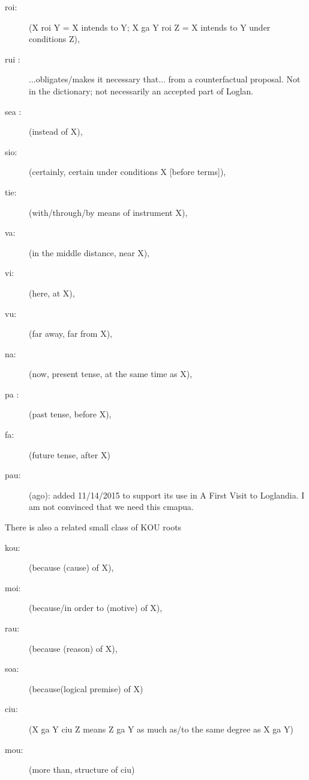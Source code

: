 \documentclass[12pt]{book}
\begin{document}
\begin{description}
\item[roi:] (X roi Y = X intends to Y; X ga Y roi Z = X intends to Y under conditions Z), 

\item[rui :] ...obligates/makes it necessary that... from a counterfactual proposal.  Not in the dictionary; not necessarily an accepted part of Loglan.

\item[sea :] (instead of X), 

\item[sio:]  (certainly, certain under conditions X [before terms]), 

\item[tie:]  (with/through/by means of instrument X), 

\item[va:]  (in the middle distance, near X), 

\item[vi:]  (here, at X), 

\item[vu:]  (far away, far from X), 

\item[na:]  (now, present tense, at the same time as X), 

\item[pa  :] (past tense, before X), 

\item[fa:]  (future tense, after X)

\item[pau:]  (ago):  added 11/14/2015 to support its use in A First Visit to Loglandia.  I am not convinced that we need this cmapua.


\end{description}

There is also a  related small class of KOU roots 

\begin{description}
\item[kou:] (because (cause)  of X), 
\item[moi:] (because/in order to (motive) of X), 
\item[rau:] (because (reason)  of X), 
\item[soa:] (because(logical premise) of X)

\item[ciu:]  (X ga Y ciu Z means Z ga Y as much as/to the same degree as X ga Y)
\item[mou:]  (more than, structure of ciu)
\end{description}
\end{document}
